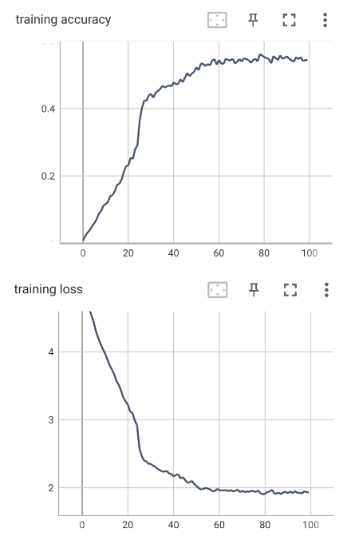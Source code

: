 \documentclass[UTF8]{ctexart}
\begin{document}
    \begin{figure}[h]
        \centering
        \begin{minipage}{0.45\textwidth}
            \centering
            \includegraphics[width=\textwidth]{figs/TensorBoard/CUB_scratch/scratch_train_acc.jpg}
        \end{minipage}
        \hfill
        \begin{minipage}{0.45\textwidth}
            \centering
            \includegraphics[width=\textwidth]{figs/TensorBoard/CUB_scratch/scratch_train_loss.jpg}
        \end{minipage}
    

\end{figure}
\end{document}
